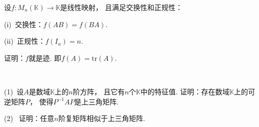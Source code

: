\bigskip

\begin{example}
    设$f: M_{n}(\mathbb{K}) \to \mathbb{K}$是线性映射，
    且满足交换性和正规性：

    (i)~交换性：$f(AB) = f(BA)$.

    (ii)~正规性：$f(I_n) = n$.

    证明：$f$就是迹.
    即$f(A) = \mathrm{tr}(A)$.
\end{example}

\bigskip

\begin{example}~

    (1)~设$A$是数域$\mathbb{K}$上的$n$阶方阵，
    且它有$n$个$\mathbb{K}$中的特征值.
    证明：存在数域$\mathbb{K}$上的可逆矩阵$P$，
    使得$P^{-1}AP$是上三角矩阵.

    (2)~
    证明：任意$n$阶复矩阵相似于上三角矩阵.
\end{example}